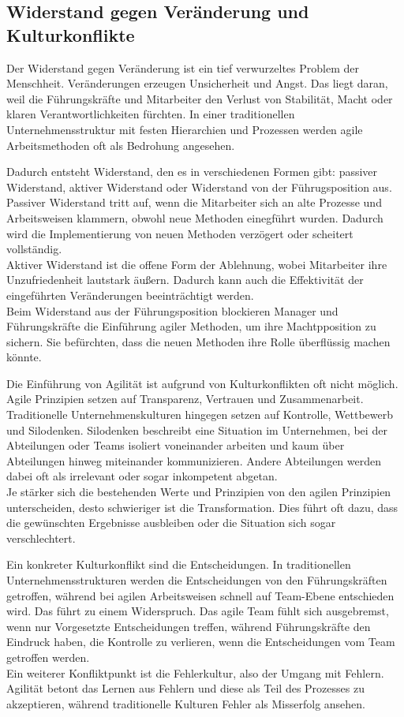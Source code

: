 \documentclass[ngerman]{seminarvorlage}
\begin{document}
\subsection{Widerstand gegen Veränderung und Kulturkonflikte}
Der Widerstand gegen Veränderung ist ein tief verwurzeltes Problem der Menschheit. Veränderungen erzeugen Unsicherheit und Angst. Das liegt daran, weil die Führungskräfte und Mitarbeiter den Verlust von Stabilität, Macht oder klaren Verantwortlichkeiten fürchten. In einer traditionellen Unternehmensstruktur mit festen Hierarchien und Prozessen werden agile Arbeitsmethoden oft als Bedrohung angesehen.\cite{Frischherz.2024}

Dadurch entsteht Widerstand, den es in verschiedenen Formen gibt: passiver Widerstand, aktiver Widerstand oder Widerstand von der Führugsposition aus.\\ Passiver Widerstand tritt auf, wenn die Mitarbeiter sich an alte Prozesse und Arbeitsweisen klammern, obwohl neue Methoden einegführt wurden. Dadurch wird die Implementierung von neuen Methoden verzögert oder scheitert vollständig.\\ Aktiver Widerstand ist die offene Form der Ablehnung, wobei Mitarbeiter ihre Unzufriedenheit lautstark äußern. Dadurch kann auch die Effektivität der eingeführten Veränderungen beeinträchtigt werden. \\Beim Widerstand aus der Führungsposition blockieren Manager und Führungskräfte die Einführung agiler Methoden, um ihre Machtpposition zu sichern. Sie befürchten, dass die neuen Methoden ihre Rolle überflüssig machen könnte.

Die Einführung von Agilität ist aufgrund von Kulturkonflikten oft nicht möglich. Agile Prinzipien setzen auf Transparenz, Vertrauen und Zusammenarbeit. Traditionelle Unternehmenskulturen hingegen setzen auf Kontrolle, Wettbewerb und Silodenken. Silodenken beschreibt eine Situation im Unternehmen, bei der Abteilungen oder Teams isoliert voneinander arbeiten und kaum über Abteilungen hinweg miteinander kommunizieren. Andere Abteilungen werden dabei oft als irrelevant oder sogar inkompetent abgetan.\\ Je stärker sich die bestehenden Werte und Prinzipien von den agilen Prinzipien unterscheiden, desto schwieriger ist die Transformation. Dies führt oft dazu, dass die gewünschten Ergebnisse ausbleiben oder die Situation sich sogar verschlechtert.\cite{Natsiopoulou.,tractionwise.2023}

Ein konkreter Kulturkonflikt sind die Entscheidungen. In traditionellen Unternehmensstrukturen werden die Entscheidungen von den Führungskräften getroffen, während bei agilen Arbeitsweisen schnell auf Team-Ebene entschieden wird. Das führt zu einem Widerspruch. Das agile Team fühlt sich ausgebremst, wenn nur Vorgesetzte Entscheidungen treffen, während Führungskräfte den Eindruck haben, die Kontrolle zu verlieren, wenn die Entscheidungen vom Team getroffen werden.\\
Ein weiterer Konfliktpunkt ist die Fehlerkultur, also der Umgang mit Fehlern. Agilität betont das Lernen aus Fehlern und diese als Teil des Prozesses zu akzeptieren, während traditionelle Kulturen Fehler als Misserfolg ansehen.\cite{wavestone.2024}
\end{document}
